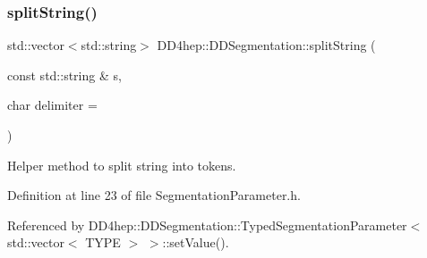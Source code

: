 \subsubsection{\texorpdfstring{split\+String()}{splitString()}}
{\footnotesize\ttfamily std\+::vector$<$std\+::string$>$ D\+D4hep\+::\+D\+D\+Segmentation\+::split\+String (\begin{DoxyParamCaption}\item[{const std\+::string \&}]{s,  }\item[{char}]{delimiter = {\ttfamily \textquotesingle{}~\textquotesingle{}} }\end{DoxyParamCaption})\hspace{0.3cm}{\ttfamily [inline]}}



Helper method to split string into tokens. 



Definition at line 23 of file Segmentation\+Parameter.\+h.



Referenced by D\+D4hep\+::\+D\+D\+Segmentation\+::\+Typed\+Segmentation\+Parameter$<$ std\+::vector$<$ T\+Y\+P\+E $>$ $>$\+::set\+Value().

